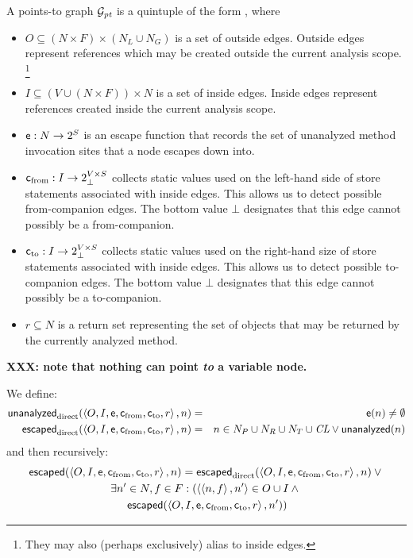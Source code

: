 \documentclass[11pt,notitlepage]{article}
\newcommand{\bigvar}[1]{\ensuremath{\text{\it #1}}}
\newcommand{\func}[1]{\ensuremath{\text{\sffamily #1}}}
\begin{document}
A points-to graph $\mathcal{G}_\bigvar{pt}$ is a quintuple of the form \ptgraph, where
\begin{itemize}
\item $O \subseteq (N\times F)\times(N_L \cup N_G)$ is a set of
outside edges.  Outside edges represent references which may be
created outside the current analysis scope.%
\footnote{They may also (perhaps exclusively) alias to inside edges.}
\item $I \subseteq (V\cup(N\times F))\times N$ is a set of inside
edges.  Inside edges represent references created inside the current
analysis scope.
\item $\func{e}:N\to 2^S$ is an escape function that records the set of
unanalyzed method invocation sites that a node escapes down into.
\item $\func{c}_\text{from}:I\to 2^{V\times S}_\bot$ collects static values
used on the left-hand side of store statements associated with
inside edges.  This allows us to detect possible from-companion edges.
The bottom value $\bot$ designates that this edge cannot possibly be
a from-companion.
\item $\func{c}_\text{to}:I\to 2^{V\times S}_\bot$ collects static values
used on the right-hand size of store statements associated with
inside edges.  This allows us to detect possible to-companion edges.
The bottom value $\bot$ designates that this edge cannot possibly be
a to-companion.
\item $r \subseteq N$ is a return set representing the set of objects
that may be returned by the currently analyzed method.
\end{itemize}
\textbf{XXX: note that nothing can point \emph{to} a variable node.}

We define:
\begin{eqnarray*}
\func{unanalyzed}_\text{direct}(\ptgraph, n) &=&
\func{e}(n)\neq\emptyset
\\
\func{escaped}_\text{direct}(\ptgraph, n) &=&
 n\in N_P \cup N_R \cup N_T \cup \bigvar{CL}
 \vee
 \func{unanalyzed}(n)
\end{eqnarray*}
and then recursively:
\begin{multline*}
\func{escaped}%
              (\ptgraph,n) =
 \func{escaped}_\text{direct}(\ptgraph,n) \vee {}
\\
 \exists n'\in N,f\in F : \left(\tuple{\tuple{n,f},n'}\in O\cup I
 \wedge
{} \right. \\ \left.
 \func{escaped}%
               (\ptgraph,n')\right)
\end{multline*}
\end{document}

